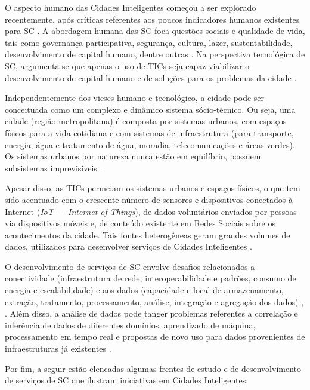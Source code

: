 \documentclass[
	12pt,				%
	oneside,			%
	a4paper,			%
	english,			%
	brazil				%
	]{abntex2ppgsi}
\begin{document}
O aspecto humano das Cidades Inteligentes começou a ser explorado recentemente, após críticas referentes aos poucos indicadores humanos existentes para SC \cite{Ahvenniemi2017} \cite{Finger2017}. A abordagem humana das SC foca questões sociais e qualidade de vida, tais como governança participativa, segurança, cultura, lazer, sustentabilidade, desenvolvimento de capital humano, dentre outras  \cite{Ahvenniemi2017}. Na perspectiva tecnológica de SC, argumenta-se que apenas o uso de TICs seja capaz viabilizar o desenvolvimento de capital humano e de soluções para os problemas da cidade \cite{Kummitha2017}.

Independentemente dos vieses humano e tecnológico, a cidade pode ser conceituada como um complexo e dinâmico sistema sócio-técnico. Ou seja, uma cidade (região metropolitana) é composta por sistemas urbanos, com espaços físicos para a vida cotidiana e com sistemas de infraestrutura (para transporte, energia, água e tratamento de água, moradia, telecomunicações e áreas verdes). Os sistemas urbanos por natureza nunca estão em equilíbrio, possuem subsistemas imprevisíveis \cite{Finger2017}.

Apesar disso, as TICs permeiam os sistemas urbanos e espaços físicos, o que tem sido acentuado com o crescente número de sensores e dispositivos conectados à Internet (\textit{IoT --- Internet of Things}), de dados voluntários enviados por pessoas via dispositivos móveis e, de conteúdo existente em Redes Sociais sobre os acontecimentos da cidade. Tais fontes heterogêneas geram grandes volumes de dados, utilizados para desenvolver serviços de Cidades Inteligentes \cite{Finger2017} \cite{Ang2017}.

O desenvolvimento de serviços de SC envolve desafios relacionados a conectividade (infraestrutura de rede, interoperabilidade e padrões, consumo de energia e escalabilidade) e aos dados (capacidade e local de armazenamento, extração, tratamento, processamento, análise, integração e agregação dos dados) \cite{Ang2017}, \cite{Xiao2017}. Além disso, a análise de dados pode tanger problemas referentes a correlação e inferência de dados de diferentes domínios, aprendizado de máquina, processamento em tempo real e propostas de novo uso para dados provenientes de infraestruturas já existentes \cite{Ang2017}.

Por fim, a seguir estão elencadas algumas frentes de estudo e de desenvolvimento de serviços de SC que ilustram iniciativas em Cidades Inteligentes:
\end{document}
